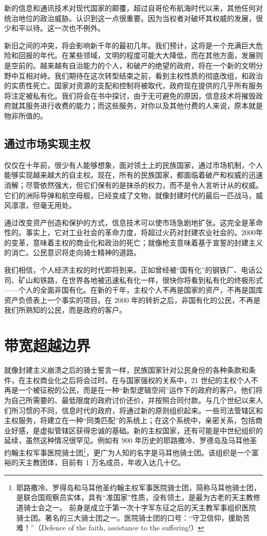 新的信息和通讯技术对现代国家的颠覆，超过自哥伦布航海时代以来，其他任何对统治地位的政治威胁。认识到这一点很重要。因为当权者对破坏其权威的发展，很少和平以待。这一次也不例外。


新旧之间的冲突，将会影响新千年的最初几年。我们预计，这将是一个充满巨大危险和回报的年代。在某些领域，文明的程度可能大大降低，而在其他方面，发展则是空前的。越来越有自治能力的个人，和破产的绝望的政府，将在一个新的文明分野中互相对峙。我们期待在这次转型结束之前，看到主权性质的彻底改组，和政治的实质性死亡。国家对资源的支配和控制将被取代，政府现在提供的几乎所有服务将注定被私有化。我们将会在书中探讨，由于无可避免的原因，信息技术将摧毁政府就其服务进行收费的能力；而这些服务，对你以及其他付费的人来说，原本就是物非所值的。


\subsection{通过市场实现主权}
仅仅在十年前，很少有人能够想象，面对领土上的民族国家，通过市场机制，个人能够实现越来越大的自主权。现在，所有的民族国家，都面临着破产和权威的迅速消解；尽管依然强大，但它们保有的是抹杀的权力，而不是令人言听计从的权威。它们的洲际导弹和航空母舰，已经变成了文物，就像封建时代的最后一匹战马，威风凛凛，但毫无用处。


通过改变资产创造和保护的方式，信息技术可以使市场急剧地扩张。这完全是革命性的。事实上，它对工业社会的革命力度，将超过火药对封建农业社会的。2000年的变革，意味着主权的商业化和政治的死亡；就像枪支意味着基于宣誓的封建主义的消亡。公民意识将走向骑士精神的道路。


我们相信，个人经济主权的时代即将到来。正如曾经被“国有化”的钢铁厂、电话公司、矿山和铁路，在世界各地被迅速私有化一样，很快你将看到私有化的终极形式——个人的全面非国有化。在新的千年，主权个人不再是国家的资产，不再是国库资产负债表上一个事实的项目。在 2000 年的转折之后，非国有化的公民，不再是我们所熟知的公民，而是政府的客户。


\section{带宽超越边界}
就像封建主义崩溃之后的骑士誓言一样，民族国家针对公民身份的各种条款和条件，在主权商业化之后将会过时。在与国家强权的关系中，21 世纪的主权个人不再是一个被征税的公民，而是在一种“新型逻辑空间”运作下的政府的客户。他们将为自己所需要的、最低限度的政府讨价还价，并按照合同付款。与几个世纪以来人们所习惯的不同，信息时代的政府，将通过新的原则组织起来。一些司法管辖区和主权服务，将建立在一种“同类匹配”的系统上；在这个系统中，亲密关系，包括商业好感，是虚拟管辖区获得忠诚的基础。新的主权国家，还有可能是中世纪组织的延续，虽然这种情况很罕见。例如有 900 年历史的耶路撒冷、罗德岛及马耳他圣约翰主权军事医院骑士团\footnote{耶路撒冷、罗得岛和马耳他圣约翰主权军事医院骑士团，简称马耳他骑士团，是联合国观察员实体，具有“准国家”性质，没有领土，是最为古老的天主教修道骑士会之一。 前身是成立于第一次十字军东征之后的天主教军事组织医院骑士团。著名的三大骑士团之一。医院骑士团的口号：“守卫信仰，援助苦难！”（Defence of the faith, assistance to the suffering!）}，更广为人知的名字是马耳他骑士团。该组织是一个富裕的天主教团体，目前有 1 万名成员，年收入达几十亿。


